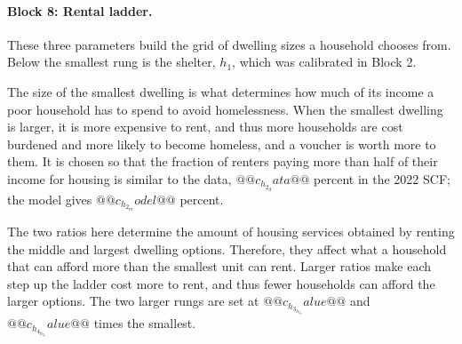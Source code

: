 \documentclass[10pt]{article}
\begin{document}
\paragraph{Block 8: Rental ladder.} These three parameters build the grid of dwelling
sizes a household chooses from. Below the smallest rung is the shelter, $h_1$, which was calibrated in Block 2.
\begin{description}\setlength{\itemsep}{0.25em}\setlength{\parskip}{0em}
\item[$h_2$, the smallest rental size.]   The size of the smallest dwelling is what determines how much of its income a poor household has to spend to avoid homelessness. When the smallest dwelling is larger, it is more expensive to rent, and thus more households are cost burdened and more likely to become homeless, and a voucher is worth more to them. It is chosen so that
the fraction of renters paying more than half of their income for housing is similar to
the data, $@@c_h_2_data@@$ percent in the 2022 SCF; the model gives $@@c_h_2_model@@$
percent.
\item[$h_3/h_2$ and $h_4/h_2$, the spacing of the ladder.]   The two ratios here determine the amount of housing services obtained by renting the middle and largest dwelling options. Therefore, they affect what a household that can afford more than the smallest unit can rent. Larger ratios make each step up the ladder cost more to rent, and thus fewer households can afford the larger options. The two larger
rungs are set at $@@c_h_3_h_2_value@@$ and $@@c_h_4_h_2_value@@$ times the smallest.
\end{description}
\end{document}
